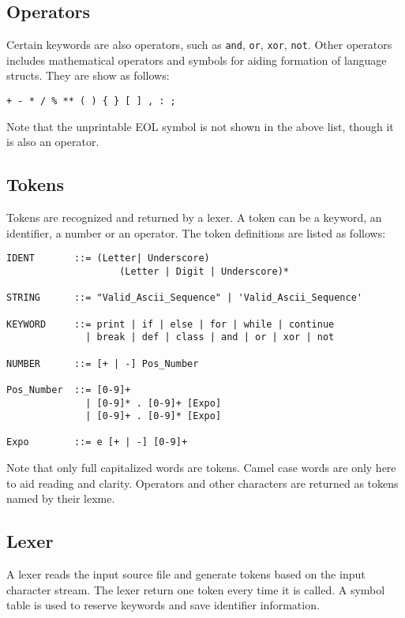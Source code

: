 \documentclass[10pt,a4paper]{article}
\begin{document}
\subsection{Operators}
Certain keywords are also operators, such as \lstinline$and$, 
\lstinline$or$, \lstinline$xor$, \lstinline$not$. Other operators
includes mathematical operators and symbols for aiding formation
of language structs. They are show as follows:
\begin{lstlisting}
+ - * / % ** ( ) { } [ ] , : ;
\end{lstlisting}
Note that the unprintable EOL symbol is not shown in the above list,
though it is also an operator. 

\subsection{Tokens}
Tokens are recognized and returned by a lexer. A token can be a keyword,
an identifier, a number or an operator. The token definitions are listed
as follows:

\begin{verbatim}
IDENT       ::= (Letter| Underscore) 
                    (Letter | Digit | Underscore)*

STRING      ::= "Valid_Ascii_Sequence" | 'Valid_Ascii_Sequence'

KEYWORD     ::= print | if | else | for | while | continue 
              | break | def | class | and | or | xor | not
              
NUMBER      ::= [+ | -] Pos_Number

Pos_Number  ::= [0-9]+ 
              | [0-9]* . [0-9]+ [Expo] 
              | [0-9]+ . [0-9]* [Expo]

Expo        ::= e [+ | -] [0-9]+
\end{verbatim}

Note that only full capitalized words are tokens. Camel case words
are only here to aid reading and clarity. 
Operators and other characters are returned as tokens named by their lexme.

\subsection{Lexer}
A lexer reads the input source file and generate tokens based on 
the input character stream. The lexer return one token every time
it is called. A symbol table is used to reserve keywords and save
identifier information.

\pagebreak
\end{document}

